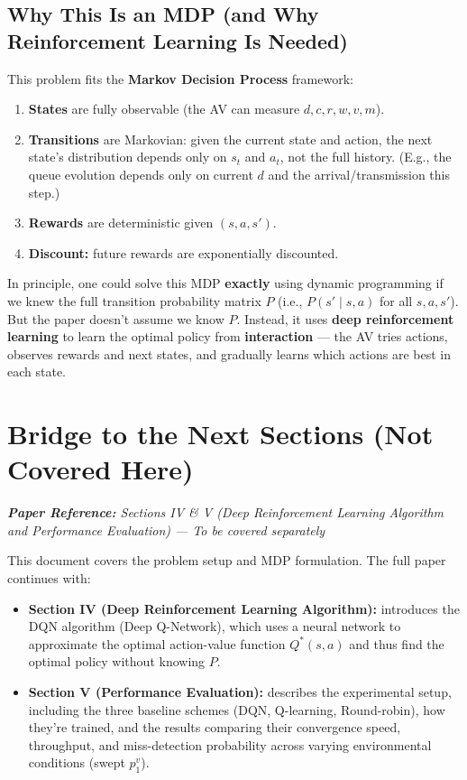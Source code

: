 \documentclass[12pt,a4paper]{article}
\begin{document}
\subsection{Why This Is an MDP (and Why Reinforcement Learning Is Needed)}

This problem fits the \textbf{Markov Decision Process} framework:
\begin{enumerate}
    \item \textbf{States} are fully observable (the AV can measure $d, c, r, w, v, m$).
    \item \textbf{Transitions} are Markovian: given the current state and action, the next state's distribution depends only on $s_t$ and $a_t$, not the full history. (E.g., the queue evolution depends only on current $d$ and the arrival/transmission this step.)
    \item \textbf{Rewards} are deterministic given $(s, a, s')$.
    \item \textbf{Discount:} future rewards are exponentially discounted.
\end{enumerate}

In principle, one could solve this MDP \textbf{exactly} using dynamic programming if we knew the full transition probability matrix $P$ (i.e., $P(s' \mid s, a)$ for all $s, a, s'$). But the paper doesn't assume we know $P$. Instead, it uses \textbf{deep reinforcement learning} to learn the optimal policy from \textbf{interaction} --- the AV tries actions, observes rewards and next states, and gradually learns which actions are best in each state.

\section{Bridge to the Next Sections (Not Covered Here)}

\noindent\textit{\textbf{Paper Reference:} Sections IV \& V (Deep Reinforcement Learning Algorithm and Performance Evaluation) --- \textit{To be covered separately}}

This document covers the problem setup and MDP formulation. The full paper continues with:

\begin{itemize}
    \item \textbf{Section IV (Deep Reinforcement Learning Algorithm):} introduces the DQN algorithm (Deep Q-Network), which uses a neural network to approximate the optimal action-value function $Q^*(s, a)$ and thus find the optimal policy without knowing $P$.

    \item \textbf{Section V (Performance Evaluation):} describes the experimental setup, including the three baseline schemes (DQN, Q-learning, Round-robin), how they're trained, and the results comparing their convergence speed, throughput, and miss-detection probability across varying environmental conditions (swept $p^v_1$).
\end{itemize}
\end{document}
